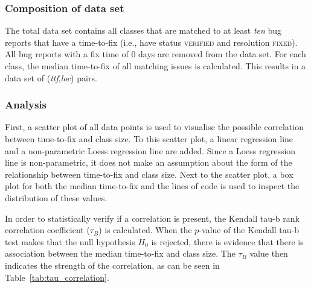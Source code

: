 \vspace{\baselineskip}
\hypbc{}

\subsubsection{Composition of data set}
The total data set contains all classes that are matched to at least \emph{ten} bug reports that have a time-to-fix (i.e., have status \textsc{verified} and resolution \textsc{fixed}). All bug reports with a fix time of 0 days are removed from the data set. For each class, the median time-to-fix of all matching issues is calculated. This results in a data set of (\emph{ttf},\emph{loc}) pairs.

\subsubsection{Analysis}
First, a scatter plot of all data points is used to visualise the possible correlation between time-to-fix and class size. To this scatter plot, a linear regression line and a non-parametric Loess \cite{Cleveland1979,Cleveland1988} regression line are added. Since a Loess regression line is non-parametric, it does not make an assumption about the form of the relationship between time-to-fix and class size. Next to the scatter plot, a box plot for both the median time-to-fix and the lines of code is used to inspect the distribution of these values.

In order to statistically verify if a correlation is present, the Kendall tau-b rank correlation coefficient ($\tau_B$) is calculated. When the $p$-value of the Kendall tau-b test makes that the null hypothesis $H_0$ is rejected, there is evidence that there is association between the median time-to-fix and class size. The $\tau_B$ value then indicates the strength of the correlation, as can be seen in Table~\ref{tab:tau_correlation}.


